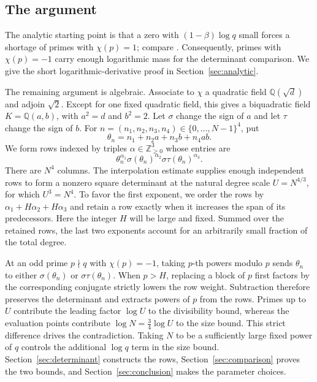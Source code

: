 \documentclass[11pt,a4paper]{amsart}
\theoremstyle{remark}
\newcommand{\Q}{\mathbb Q}
\newcommand{\N}{\mathbb Z_{\ge0}}
\numberwithin{equation}{section}
\begin{document}
\subsection*{The argument}
The analytic starting point is that a zero with
$(1-\beta)\log q$ small forces a shortage of primes with $\chi(p)=1$;
compare \cite[Section~5]{FI}. Consequently, primes with $\chi(p)=-1$
carry enough logarithmic mass for the determinant comparison. We give the
short logarithmic-derivative proof in Section~\ref{sec:analytic}.

The remaining argument is algebraic. Associate to $\chi$ a quadratic
field $\Q(\sqrt d)$ and adjoin $\sqrt2$. Except for one fixed quadratic
field, this gives a biquadratic field $K=\Q(a,b)$, with
$a^2=d$ and $b^2=2$. Let $\sigma$ change the sign of $a$ and let
$\tau$ change the sign of $b$. For
$n=(n_1,n_2,n_3,n_4)\in\{0,\ldots,N-1\}^4$, put
\[
 \theta_n=n_1+n_2a+n_3b+n_4ab.
\]
We form rows indexed by triples $\alpha\in\N^3$ whose entries are
\[
 \theta_n^{\alpha_1}\sigma(\theta_n)^{\alpha_2}
                  \sigma\tau(\theta_n)^{\alpha_3}.
\]
There are $N^4$ columns. The interpolation estimate supplies enough
independent rows to form a nonzero square determinant at the natural
degree scale $U=N^{4/3}$, for which
$U^3=N^4$. To favor the first exponent, we order the rows by
$\alpha_1+H\alpha_2+H\alpha_3$ and retain a row exactly when it
increases the span of its predecessors. Here the integer $H$ will
be large and fixed. Summed over the retained rows, the last two
exponents account for an arbitrarily small fraction of the total degree.

At an odd prime $p\nmid q$ with $\chi(p)=-1$, taking $p$-th powers
modulo $p$ sends $\theta_n$ to either $\sigma(\theta_n)$ or
$\sigma\tau(\theta_n)$. When $p>H$, replacing a block of $p$ first
factors by the corresponding conjugate strictly lowers the row
weight. Subtraction therefore preserves the determinant and extracts
powers of $p$ from the rows. Primes up to $U$ contribute the leading
factor $\log U$ to the divisibility bound, whereas the evaluation
points contribute $\log N=\tfrac34\log U$ to the size bound.
This strict difference drives the contradiction. Taking $N$ to be
a sufficiently large fixed power of $q$ controls the additional
$\log q$ term in the size bound.
Section~\ref{sec:determinant} constructs the rows,
Section~\ref{sec:comparison} proves the two bounds, and
Section~\ref{sec:conclusion} makes the parameter choices.
\end{document}
